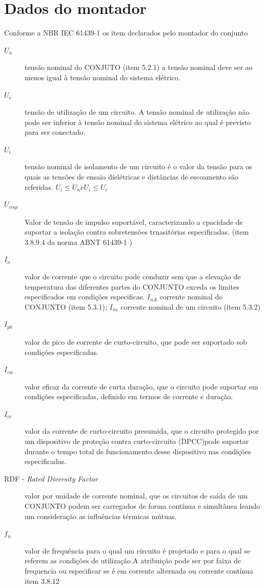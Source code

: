 \section{Dados do montador}
Conforme a NBR IEC 61439-1 os item declarados pelo montador do conjunto %
\begin{description}
\item[$U_{n}$] tensão nominal do CONJUTO (item 5.2.1) a tensão nominal deve ser ao menos igual à tensão nominal do sistema elétrico.

\item[$U_{e}$] tensão de utilização de um circuito. A tensão nominal de utilização não pode ser inferior à tensão nominal do sistema elétrico ao qual é previsto para ser conectado.
\item[$U_{i}$] tensão nominal de isolamento de um circuito é o valor da tensão para os quais as tensões de ensaio dielétricas e distâncias de escoamento são referidas. $U_{i} \leq U_{n} e U_{i} \leq U_{e}$

\item[$U_{imp}$] Valor de tensão de impulso suportável, caracterizando a cpacidade de suportar a isolação contra sobretensões trnasitórias especificadas. (item 3.8.9.4 da norma ABNT 61439-1 )

\item[$I_{n}$] valor de corrente que o circuito pode conduzir sem que a elevação de temperatura das diferentes partes do CONJUNTO exceda os limites especificados em condições especificas. $I_{nA}$ corrente nominal do CONJUNTO (item 5.3.1); $I_{nc}$ corrente nominal de um circuito (item 5.3.2)
\item[$I_{pk}$] valor de pico de corrente de curto-circuito, que pode ser suportado sob condições especificadas.
\item[$I_{cw}$] valor eficaz da corrente de curta duração, que o circuito pode suportar em condições especificadas, definido em termos de corrente e duração.
\item[$I_{cc}$]valor da corrente de curto-circuito presumida, que o circuito protegido por um dispositivo de proteção contra curto-circuito (DPCC)pode suportar durante o tempo total de funcionamento desse dispositivo nas condições especificadas.
\item[RDF - \textit{Rated Diversity Factor}] valor por unidade de corrente nominal, que os circuitos de saída de um CONJUNTO podem ser carregados de forma contínua e simultânea leando um consideração as influências térmicas mútuas.
\item[$f_{n}$] valor de frequência para o qual um circuito é projetado e para o qual se referem as condições de utilização.A atribuição pode ser por faixa de frequencia ou especificar se é em corrente alternada ou corrente contínua item 3.8.12


\end{description}


